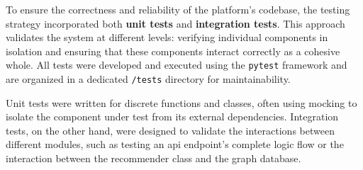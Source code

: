 To ensure the correctness and reliability of the platform's codebase, the testing strategy incorporated both \textbf{unit tests} and \textbf{integration tests}. This approach validates the system at different levels: verifying individual components in isolation and ensuring that these components interact correctly as a cohesive whole. All tests were developed and executed using the \texttt{pytest} framework and are organized in a dedicated \texttt{/tests} directory for maintainability.

Unit tests were written for discrete functions and classes, often using mocking to isolate the component under test from its external dependencies. Integration tests, on the other hand, were designed to validate the interactions between different modules, such as testing an \acs{api} endpoint's complete logic flow or the interaction between the recommender class and the graph database.